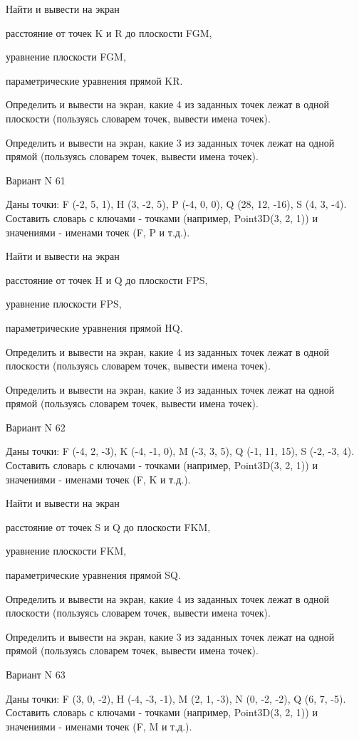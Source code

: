 \documentclass[11pt]{report}
\begin{document}
Найти и вывести на экран


расстояние от точек K и R до плоскости FGM,


уравнение плоскости FGM,


параметрические уравнения прямой KR.


Определить и вывести на экран, какие 4 из заданных точек лежат в одной плоскости (пользуясь словарем точек, вывести имена точек).


Определить и вывести на экран, какие 3 из заданных точек лежат на одной прямой (пользуясь словарем точек, вывести имена точек).

\newpage
Вариант N 61

Даны точки: F (-2, 5, 1), H (3, -2, 5), P (-4, 0, 0), Q (28, 12, -16), S (4, 3, -4).
Составить словарь с ключами - точками (например, Point3D(3, 2, 1)) и значениями - именами точек (F, P и т.д.).


Найти и вывести на экран


расстояние от точек H и Q до плоскости FPS,


уравнение плоскости FPS,


параметрические уравнения прямой HQ.


Определить и вывести на экран, какие 4 из заданных точек лежат в одной плоскости (пользуясь словарем точек, вывести имена точек).


Определить и вывести на экран, какие 3 из заданных точек лежат на одной прямой (пользуясь словарем точек, вывести имена точек).

\newpage
Вариант N 62

Даны точки: F (-4, 2, -3), K (-4, -1, 0), M (-3, 3, 5), Q (-1, 11, 15), S (-2, -3, 4).
Составить словарь с ключами - точками (например, Point3D(3, 2, 1)) и значениями - именами точек (F, K и т.д.).


Найти и вывести на экран


расстояние от точек S и Q до плоскости FKM,


уравнение плоскости FKM,


параметрические уравнения прямой SQ.


Определить и вывести на экран, какие 4 из заданных точек лежат в одной плоскости (пользуясь словарем точек, вывести имена точек).


Определить и вывести на экран, какие 3 из заданных точек лежат на одной прямой (пользуясь словарем точек, вывести имена точек).

\newpage
Вариант N 63

Даны точки: F (3, 0, -2), H (-4, -3, -1), M (2, 1, -3), N (0, -2, -2), Q (6, 7, -5).
Составить словарь с ключами - точками (например, Point3D(3, 2, 1)) и значениями - именами точек (F, M и т.д.).
\end{document}
